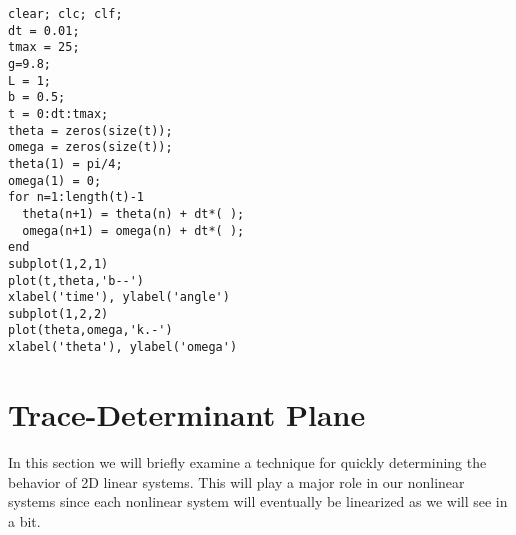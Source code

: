 \begin{lstlisting}
clear; clc; clf; 
dt = 0.01;
tmax = 25;
g=9.8;
L = 1;
b = 0.5;
t = 0:dt:tmax;
theta = zeros(size(t));
omega = zeros(size(t));
theta(1) = pi/4;
omega(1) = 0;
for n=1:length(t)-1
  theta(n+1) = theta(n) + dt*( );
  omega(n+1) = omega(n) + dt*( );
end
subplot(1,2,1)
plot(t,theta,'b--')
xlabel('time'), ylabel('angle')
subplot(1,2,2)
plot(theta,omega,'k.-')
xlabel('theta'), ylabel('omega')
\end{lstlisting}

\newpage\section{Trace-Determinant Plane}
In this section we will briefly examine a technique for quickly determining
the behavior of 2D linear systems.  This will play a major role in our nonlinear systems
since each nonlinear system will eventually be linearized as we will see in a bit.  


